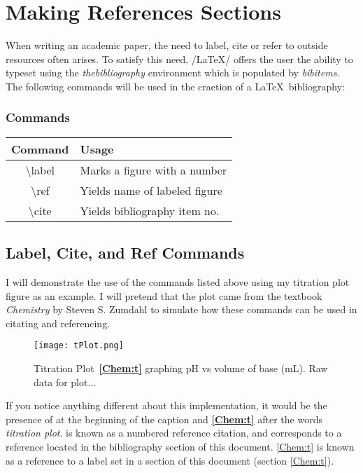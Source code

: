 \documentclass[12pt,journal,compsoc]{IEEEtran}
\begin{document}
\section{Making References Sections}
When writing an academic paper, the need to label, cite or refer to outside resources often arises. To satisfy this need, /LaTeX/ offers the user the ability to typeset using the \emph{thebibliography} environment which is populated by \emph{bibitems}. The following commands will be used in the craetion of a \LaTeX\ bibliography:

\subsubsection*{Commands}
\begin{center}
\begin{tabular}{c l}
Command & Usage\\
\hline
\textbackslash label & Marks a figure with a number\\
\hline
\textbackslash ref & Yields name of labeled figure\\
\hline
\textbackslash cite & Yields bibliography item no.\\
\end{tabular}
\end{center}

\subsection{Label, Cite, and Ref Commands}
I will demonstrate the use of the commands listed above using my titration plot figure as an example. I will pretend that the plot came from the textbook \emph{Chemistry} by Steven S. Zumdahl to simulate how these commands can be used in citating and referencing.
\label{Chem:t}
\begin{figure}[H]
    \centering
    \texttt{[image: tPlot.png]}
    \caption{\textbf{\cite{Chemistry:tplot}} 
    Titration Plot~\textbf{\ref{Chem:t}} graphing pH vs volume of 
    base (mL). Raw data for plot...}
\end{figure}
\noindent
If you notice anything different about this implementation, it would be the presence of \textbf{\cite{Chemistry:tplot}} at the beginning of the caption and \textbf{\ref{Chem:t}} after the words \emph{titration plot}. \cite{Chemistry:tplot} is known as a numbered reference citation, and corresponds to a reference located in the bibliography section of this document. \ref{Chem:t} is known as a reference to a label set in a section of this document (section \ref{Chem:t}).
\end{document}
